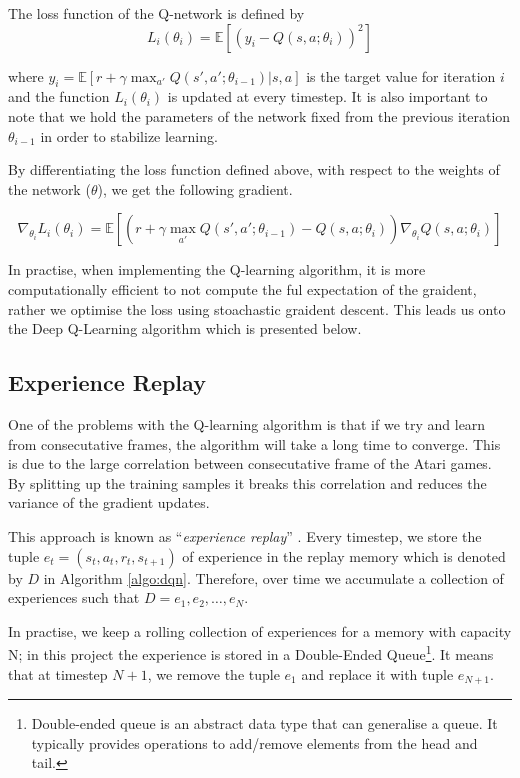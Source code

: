 \begin{defn}
	The loss function of the Q-network is defined by
	\[
		L_i(\theta_i) = \mathbb{E}\left[(y_i - Q(s, a; \theta_i))^2\right]
	\]
\end{defn}
where $y_i = \mathbb{E}\left[r + \gamma \max_{a'}Q(s', a'; \theta_{i - 1})\vert s, a\right]$ is the target value for iteration $i$ and the function $L_i(\theta_i)$ is updated at every timestep. It is also important to note that we hold the parameters of the network fixed from the previous iteration $\theta_{i - 1}$ in order to stabilize learning.

By differentiating the loss function defined above, with respect to the weights of the network ($\theta$), we get the following gradient.

\begin{defn}
	\[
		\nabla_{\theta_i} L_i(\theta_i) = \mathbb{E} \left[ \left( r + \gamma \max_{a'} Q(s', a'; \theta_{i - 1}) - Q(s, a; \theta_i)\right) \nabla_{\theta_i} Q(s, a; \theta_i) \right]
	\]
\end{defn}

In practise, when implementing the Q-learning algorithm, it is more computationally efficient to not compute the ful expectation of the graident, rather we optimise the loss using stoachastic graident descent. This leads us onto the Deep Q-Learning algorithm which is presented below.



\subsection{Experience Replay}
\label{dsgn:subsec:exp-replay}

One of the problems with the Q-learning algorithm is that if we try and learn from consecutative frames, the algorithm will take a long time to converge. This is due to the large correlation between consecutative frame of the Atari games. By splitting up the training samples it breaks this correlation and reduces the variance of the gradient updates.

This approach is known as ``\textit{experience replay}'' \cite{Lin1992ReinforcementLF}. Every timestep, we store the tuple $e_t = (s_t, a_t, r_t, s_{t+1})$ of experience in the replay memory which is denoted by $D$ in Algorithm \ref{algo:dqn}. Therefore, over time we accumulate a collection of experiences such that $D = e_1, e_2, \hdots, e_N$.

In practise, we keep a rolling collection of experiences for a memory with capacity N; in this project the experience is stored in a Double-Ended Queue\footnote{Double-ended queue is an abstract data type that can generalise a queue. It typically provides operations to add/remove elements from the head and tail.}. It means that at timestep $N+1$, we remove the tuple $e_1$ and replace it with tuple $e_{N+1}$.

